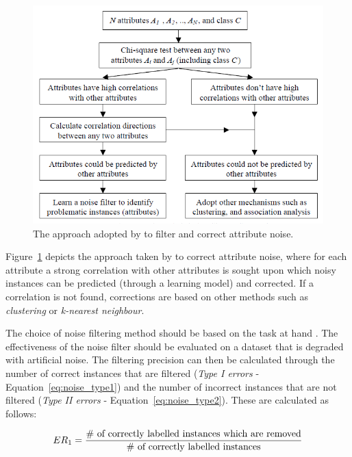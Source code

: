 \begin{figure}
  \includegraphics{graphics/noise_in_datasets/noise_imputation.png}
  \caption{The approach adopted by \citet{zhu2004class} to filter and correct attribute noise.}
  \label{fig:noise_imputation}
\end{figure}

Figure~\ref{fig:noise_imputation} depicts the approach taken by \citet{zhu2004class} to correct attribute noise, where for each attribute a strong correlation with other attributes is sought upon which noisy instances can be predicted (through a learning model) and corrected.  If a correlation is not found, corrections are based on other methods such as \textit{clustering} or \textit{k-nearest neighbour}.

The choice of noise filtering method should be based on the task at hand \citep{frenay2014classification}. The effectiveness of the noise filter should be evaluated on a dataset that is degraded with artificial noise.  The filtering precision can then be calculated through the number of correct instances that are filtered (\textit{Type I errors} - Equation~\ref{eq:noise_type1}) and the number of incorrect instances that are not filtered (\textit{Type II errors} - Equation~\ref{eq:noise_type2}).  These are calculated as follows: 

\begin{equation}\label{eq:noise_type1}
	ER\textsubscript{1} = \frac{\textnormal{\# of correctly labelled instances which are removed}}{\textnormal{\# of correctly labelled instances}}
\end{equation}

